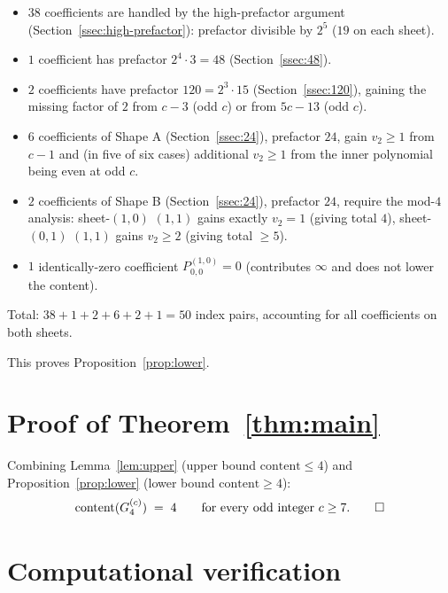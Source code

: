 \documentclass[11pt]{article}
\begin{document}
\begin{itemize}
\item $38$ coefficients are handled by the high-prefactor argument
      (Section~\ref{ssec:high-prefactor}): prefactor divisible by $2^5$
      ($19$ on each sheet).
\item $1$ coefficient has prefactor $2^4 \cdot 3 = 48$ (Section~\ref{ssec:48}).
\item $2$ coefficients have prefactor $120 = 2^3 \cdot 15$
      (Section~\ref{ssec:120}), gaining the missing factor of $2$ from $c-3$
      (odd $c$) or from $5c-13$ (odd $c$).
\item $6$ coefficients of Shape A (Section~\ref{ssec:24}), prefactor $24$, gain
      $v_2 \ge 1$ from $c-1$ and (in five of six cases) additional $v_2 \ge 1$
      from the inner polynomial being even at odd $c$.
\item $2$ coefficients of Shape B (Section~\ref{ssec:24}), prefactor $24$,
      require the mod-$4$ analysis: sheet-$(1,0)$ $(1,1)$ gains exactly $v_2 = 1$
      (giving total $4$), sheet-$(0,1)$ $(1,1)$ gains $v_2 \ge 2$ (giving total
      $\ge 5$).
\item $1$ identically-zero coefficient $P^{(1,0)}_{0,0} = 0$ (contributes
      $\infty$ and does not lower the content).
\end{itemize}
Total: $38 + 1 + 2 + 6 + 2 + 1 = 50$ index pairs, accounting for all
coefficients on both sheets.

This proves Proposition~\ref{prop:lower}.

\section{Proof of Theorem~\ref{thm:main}}

Combining Lemma~\ref{lem:upper} (upper bound $\mathrm{content} \le 4$) and
Proposition~\ref{prop:lower} (lower bound $\mathrm{content} \ge 4$):
\[
  \mathrm{content}(G_4^{(c)}) \;=\; 4 \qquad \text{for every odd integer } c \ge 7. \qed
\]

\section{Computational verification}\label{sec:verify}
\end{document}
